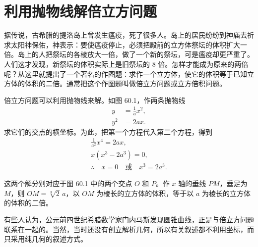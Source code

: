 \section{利用抛物线解倍立方问题}

据传说，古希腊的提洛岛上曾发生瘟疫，死了很多人。岛上的居民纷纷到神庙去祈求太阳神保佑，神表示：要使瘟疫停止，必须把殿前的立方体祭坛的体积扩大一倍。岛上的人把祭坛的各棱放大一倍，做了一个新的祭坛，可是瘟疫却更严重了。人们这才发现，新祭坛的体积实际上是旧祭坛的 $8$ 倍。怎样才能成为原来的两倍呢？从这里就提出了一个著名的作图题：求作一个立方体，使它的体积等于已知立方体的体积的二倍。通常把这个作图题叫做倍立方问题或立方倍积问题。

\noindent
\begin{minipage}[c]{0.55\textwidth}
\hspace*{2em}倍立方问题可以利用抛物线来解。如图 60.1，作两条抛物线
\begin{align*}
  y &= \frac{1}{a}x^2, \\
  y^2 &= 2ax.
\end{align*}
求它们的交点的横坐标。为此，把第一个方程代入第二个方程，得到
\begin{gather*}
  \frac{1}{a^2}x^4 = 2ax, \\
  x(x^3 - 2a^3) = 0, \\
  \therefore\quad x = 0 \quad\text{或}\quad x^3 = 2a^3.
\end{gather*}
\end{minipage}%
\hfill
\begin{minipage}[c]{0.42\textwidth}
  \centering
\end{minipage}

这两个解分别对应于图 60.1 中的两个交点 $O$ 和 $P$。作 $x$ 轴的垂线 $PM$，垂足为 $M$，则 $OM = \sqrt[3]{2}\,a$，以 $OM$ 为棱长的立方体的体积，等于以 $a$ 为棱长的立方体的体积的二倍。

有些人认为，公元前四世纪希腊数学家门内马斯发现圆锥曲线，正是与倍立方问题联系在一起的。当然，当时还没有创立解析几何，所以有关叙述都不利用坐标，而只采用纯几何的叙述方式。
